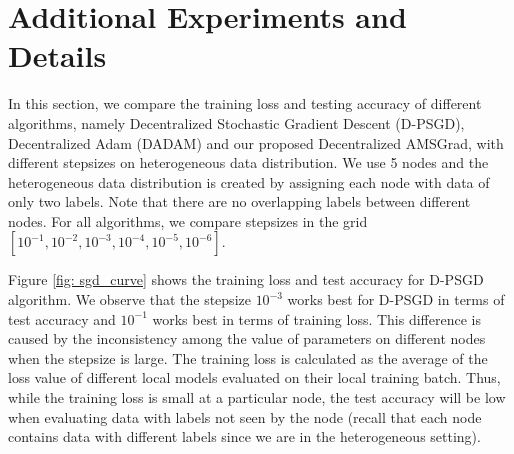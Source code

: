 \documentclass[anon,12pt]{colt2021} %
\begin{document}


\clearpage

\section{Additional Experiments and Details}\label{app: experiments}
In this section, we compare the training loss and testing accuracy of different algorithms, namely Decentralized Stochastic Gradient Descent (D-PSGD), Decentralized Adam (DADAM) and our proposed Decentralized AMSGrad,  with different stepsizes on heterogeneous data distribution. 
We use 5 nodes and the heterogeneous data distribution is created by assigning each node with data of only two labels.
Note that there are no overlapping labels between different nodes. 
For all algorithms, we compare stepsizes in the grid $[10^{-1}, 10^{-2}, 10^{-3}, 10^{-4}, 10^{-5}, 10^{-6}]$. 

Figure \ref{fig: sgd_curve} shows the training loss and test accuracy for D-PSGD algorithm.
We observe that the stepsize $10^{-3}$ works best for D-PSGD in terms of test accuracy and $10^{-1}$ works best in terms of training loss. 
This difference is caused by the inconsistency among the value of parameters on different nodes when the stepsize is large. 
The training loss is calculated as the average of the loss value of different local models evaluated on their local training batch. 
Thus, while the training loss is small at a particular node, the test accuracy will be low when evaluating data with labels not seen by the node (recall that each node contains data with different labels since we are in the heterogeneous setting).
\end{document}

